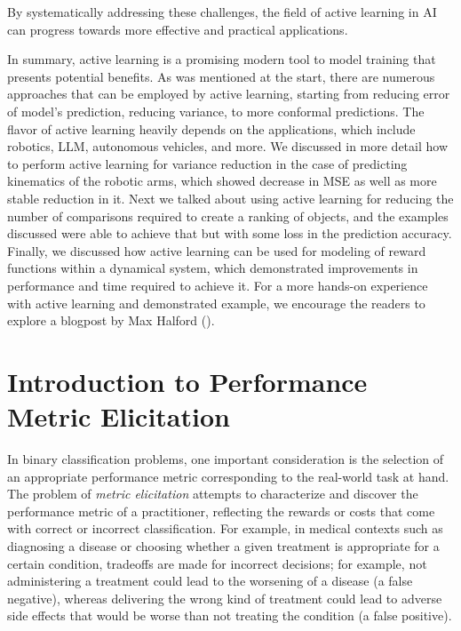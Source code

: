 \documentclass[
  letterpaper,
  DIV=11,
  numbers=noendperiod,
  oneside]{scrreprt}
\theoremstyle{remark}
\begin{document}
By systematically addressing these challenges, the field of active
learning in AI can progress towards more effective and practical
applications.

In summary, active learning is a promising modern tool to model training
that presents potential benefits. As was mentioned at the start, there
are numerous approaches that can be employed by active learning,
starting from reducing error of model's prediction, reducing variance,
to more conformal predictions. The flavor of active learning heavily
depends on the applications, which include robotics, LLM, autonomous
vehicles, and more. We discussed in more detail how to perform active
learning for variance reduction in the case of predicting kinematics of
the robotic arms, which showed decrease in MSE as well as more stable
reduction in it. Next we talked about using active learning for reducing
the number of comparisons required to create a ranking of objects, and
the examples discussed were able to achieve that but with some loss in
the prediction accuracy. Finally, we discussed how active learning can
be used for modeling of reward functions within a dynamical system,
which demonstrated improvements in performance and time required to
achieve it. For a more hands-on experience with active learning and
demonstrated example, we encourage the readers to explore a blogpost by
Max Halford ().

\section{Introduction to Performance Metric
Elicitation}\label{introduction-to-performance-metric-elicitation}

In binary classification problems, one important consideration is the
selection of an appropriate performance metric corresponding to the
real-world task at hand. The problem of \emph{metric elicitation}
attempts to characterize and discover the performance metric of a
practitioner, reflecting the rewards or costs that come with correct or
incorrect classification. For example, in medical contexts such as
diagnosing a disease or choosing whether a given treatment is
appropriate for a certain condition, tradeoffs are made for incorrect
decisions; for example, not administering a treatment could lead to the
worsening of a disease (a false negative), whereas delivering the wrong
kind of treatment could lead to adverse side effects that would be worse
than not treating the condition (a false positive).
\end{document}
